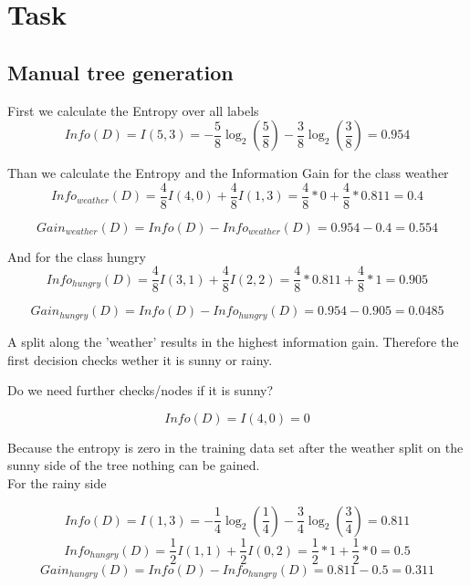 \documentclass[a4paper, 11pt]{article}
\begin{document}
\section{Task}

\subsection{Manual tree generation}

First we calculate the Entropy over all labels
\begin{equation}
    Info(D) = I(5,3) = -\frac{5}{8}\log_2(\frac{5}{8}) - \frac{3}{8}\log_2(\frac{3}{8}) = 0.954
\end{equation}

Than we calculate the Entropy and the Information Gain for the class weather
\begin{equation}
    Info_{weather}(D) = \frac{4}{8}I(4,0) + \frac{4}{8}I(1,3) = \frac{4}{8}*0 + \frac{4}{8} * 0.811 = 0.4
\end{equation}

\begin{equation}
    Gain_{weather}(D) = Info(D) - Info_{weather}(D) = 0.954 - 0.4 = 0.554
\end{equation}

And for the class hungry
\begin{equation}
    Info_{hungry}(D) = \frac{4}{8}I(3,1) + \frac{4}{8}I(2,2) =  \frac{4}{8}*0.811 + \frac{4}{8} * 1 = 0.905
\end{equation}

\begin{equation}
    Gain_{hungry}(D) = Info(D) - Info_{hungry}(D) = 0.954 - 0.905 = 0.0485
\end{equation}

A split along the 'weather' results in the highest information gain. Therefore the first decision checks wether it is sunny or rainy.

Do we need further checks/nodes if it is sunny?

\begin{equation}
    Info(D) = I(4,0) = 0
\end{equation}

Because the entropy is zero in the training data set after the weather split on the sunny side of the tree nothing can be gained.
\\
For the rainy side

\begin{equation}
    Info(D) = I(1,3) = -\frac{1}{4}\log_2(\frac{1}{4}) - \frac{3}{4}\log_2(\frac{3}{4}) = 0.811
\end{equation}
\begin{equation}
    Info_{hungry}(D) = \frac{1}{2}I(1,1) + \frac{1}{2}I(0,2) =  \frac{1}{2}*1 + \frac{1}{2} * 0 = 0.5
\end{equation}
\begin{equation}
    Gain_{hungry}(D) = Info(D) - Info_{hungry}(D) = 0.811 - 0.5 = 0.311
\end{equation}
\end{document}
